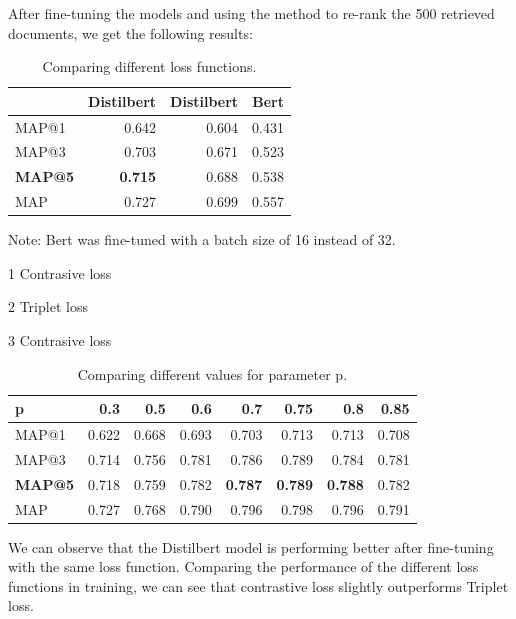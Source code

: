 \documentclass{article}
\begin{document}
After fine-tuning the models and using the method to re-rank the 500 retrieved documents, we get the following results:
\begin{table}[H]
\centering
\begin{threeparttable}
    \begin{tabular}{lrrr}
        \toprule
         & Distilbert\tnote{1} & Distilbert\tnote{2} & Bert\tnote{3} \\ \midrule
        MAP@1 		& 0.642 & 0.604 & 0.431 \\
	 MAP@3			& 0.703 & 0.671 & 0.523 \\
        \textbf{MAP@5} & \textbf{0.715} & 0.688 & 0.538 \\
        MAP 			& 0.727 	& 0.699 & 0.557 \\ \bottomrule
   \end{tabular}
\begin{tablenotes}\footnotesize
\item Note: Bert was fine-tuned with a batch size of 16 instead of 32. 
\item[1] Contrasive loss
\item[2] Triplet loss
\item[3] Contrasive loss
\end{tablenotes}
\caption{Comparing different loss functions.}
\end{threeparttable}
\end{table}
\begin{table}[t]
\centering
    \begin{tabular}{lrrrrrrr}
        \toprule
        p 				& 0.3     & 0.5    & 0.6     & 0.7     & 0.75   & 0.8    & 0.85 \\ \midrule
        MAP@1 		& 0.622 & 0.668 & 0.693 & 0.703 & 0.713 & 0.713 &	 0.708	\\
	 MAP@3		 	& 0.714 & 0.756 & 0.781 & 0.786 & 0.789 & 0.784 & 0.781 \\
        \textbf{MAP@5} & 0.718 & 0.759 & 0.782 & \textbf{0.787} & \textbf{0.789} &  \textbf{0.788} & 0.782	\\
        MAP 			& 0.727 & 0.768 & 0.790 & 0.796 & 0.798 & 0.796 & 0.791	\\ \bottomrule
   \end{tabular}
\caption{Comparing different values for parameter p.}
\end{table}
\noindent We can observe that the Distilbert model is performing better after fine-tuning with the same loss function.
Comparing the performance of the different loss functions in training, we can see that contrastive loss slightly outperforms Triplet loss.
\end{document}
